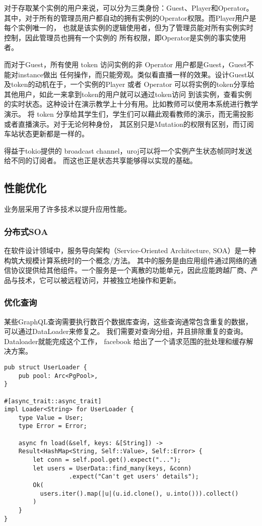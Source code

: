 对于存取某个实例的用户来说，可以分为三类身份：Guest、Player和Operator。
其中，对于所有的管理员用户都自动的拥有实例的Operator权限。而Player用户是每个实例唯一的，
也就是该实例的逻辑使用者，但为了管理员能对所有实例实时控制，因此管理员也拥有一个实例的
所有权限，即Operator是实例的事实使用者。

而对于Guest，所有使用 token 访问实例的非 Operator 用户都是Guest，Guest不能对instance做出
任何操作，而只能旁观。类似看直播一样的效果。设计Guest以及token的动机在于，一个实例的Player
或者 Operator 可以将实例的token分享给其他用户，如此一来拿到token的用户就可以通过token访问
到该实例，查看实例的实时状态。这种设计在演示教学上十分有用。比如教师可以使用本系统进行教学演示。
将 token 分享给其学生们，学生们可以藉此观看教师的演示，而无需投影或者直播演示。对于无论何种身份，
其区别只是Mutation的权限有区别，而订阅车站状态更新都是一样的。

得益于tokio提供的 broadcast channel，uroj可以将一个实例产生状态帧同时发送给不同的订阅者。
而这也正是状态共享能够得以实现的基础。

\subsection{性能优化}
业务层采用了许多技术以提升应用性能。
\subsubsection{分布式SOA}
在软件设计领域中，服务导向架构（Service-Oriented Architecture, SOA）是一种构筑大规模计算系统时的一个概念/方法。
其中的服务是由应用组件通过网络的通信协议提供给其他组件。一个服务是一个离散的功能单元，因此应能跨越厂商、产品与技术，它可以被远程访问，并被独立地操作和更新。

\subsubsection{优化查询}
某些GraphQL查询需要执行数百个数据库查询，这些查询通常包含重复的数据，可以通过DataLoader来修复之。
我们需要对查询分组，并且排除重复的查询。Dataloader就能完成这个工作，
facebook 给出了一个请求范围的批处理和缓存解决方案。
\begin{lstlisting}
pub struct UserLoader {
    pub pool: Arc<PgPool>,
}

#[async_trait::async_trait]
impl Loader<String> for UserLoader {
    type Value = User;
    type Error = Error;

    async fn load(&self, keys: &[String]) -> 
    Result<HashMap<String, Self::Value>, Self::Error> {
        let conn = self.pool.get().expect("...");
        let users = UserData::find_many(keys, &conn)
                  .expect("Can't get users' details");
        Ok(
          users.iter().map(|u|(u.id.clone(), u.into())).collect()
        )
    }
}
\end{lstlisting}

